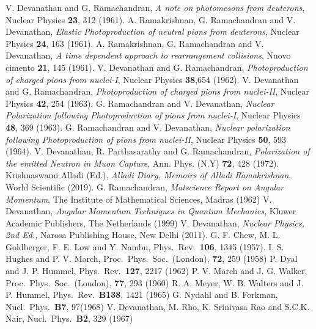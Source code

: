 \begin{thebibliography}{99}
\itemsep=0pt
 V. Devanathan and G. Ramachandran, \textit{A note on photomesons from deuterons}, Nuclear Physics \textbf{23}, 312 (1961).
 A. Ramakrishnan, G. Ramachandran and V. Devanathan, \textit{Elastic Photoproduction of neutral pions from deuterons}, Nuclear Physics \textbf{24}, 163 (1961).
 A. Ramakrishnan, G. Ramachandran and V. Devanathan, \textit{A time dependent approach to rearrangement collisions}, Nuovo cimento \textbf{21}, 145 (1961).
 V. Devanathan and G. Ramachandran, \textit{Photoproduction of charged pions from nuclei-I}, Nuclear Physics \textbf{38},654 (1962).
 V. Devanathan and G. Ramachandran, \textit{Photoproduction of charged pions from nuclei-II}, Nuclear Physics \textbf{42}, 254 (1963).
 G. Ramachandran and V. Devanathan, \textit{Nuclear Polarization following Photoproduction of pions from nuclei-I}, Nuclear Physics \textbf{48}, 369 (1963).
 G. Ramachandran and V. Devanathan, \textit{Nuclear polarization following Photoproduction of pions from nuclei-II}, Nuclear Physics \textbf{50}, 593 (1964).
 V. Devanathan, R. Parthasarathy and G. Ramachandran, \textit{Polarization of the emitted Neutron in Muon Capture}, Ann. Phys. (N.Y) \textbf{72}, 428 (1972).
 Krishnaswami Alladi (Ed.), \textit{Alladi Diary, Memoirs of Alladi Ramakrishnan}, World Scientific (2019).
 G. Ramachandran, \textit{Matscience Report on Angular Momentum}, The Institute of Mathematical Sciences, Madras (1962)
 V. Devanathan, \textit{Angular Momentum Techniques in Quantum Mechanics}, Kluwer Academic Publishers, The Netherlands (1999)
 V. Devanathan, \textit{Nuclear Physics, 2nd Ed.,} Narosa Publishing House, New Delhi (2011).
 G. F. Chew, M. L. Goldberger, F. E. Low and Y. Nambu, Phys.\ Rev.\ \textbf{106}, 1345 (1957).
 I. S. Hughes and P. V. March, Proc.\ Phys.\ Soc.\ (London), \textbf{72}, 259 (1958)
 P. Dyal and J. P. Hummel, Phys.\ Rev.\ \textbf{127}, 2217 (1962)
 P. V. March and J. G. Walker, Proc.\ Phys.\ Soc.\ (London), \textbf{77}, 293 (1960)
 R. A. Meyer, W. B. Walters and J. P. Hummel, Phys.\ Rev.\ \textbf{B138}, 1421 (1965)
 G. Nydahl and B. Forkman, Nucl.\ Phys.\ \textbf{B7}, 97(1968)
 V. Devanathan, M. Rho, K. Srinivasa Rao and S.C.K. Nair, Nucl.\ Phys.\ \textbf{B2}, 329 (1967)

\end{thebibliography}
